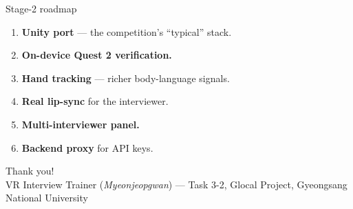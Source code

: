 \documentclass{beamer}
\begin{document}
\begin{frame}{Stage-2 roadmap}
  \begin{enumerate}
    \item \textbf{Unity port} --- the competition's ``typical'' stack.
    \item \textbf{On-device Quest 2 verification.}
    \item \textbf{Hand tracking} --- richer body-language signals.
    \item \textbf{Real lip-sync} for the interviewer.
    \item \textbf{Multi-interviewer panel.}
    \item \textbf{Backend proxy} for API keys.
  \end{enumerate}
  \bigskip
  \begin{center}
    \Large Thank you! \\[4pt]
    \footnotesize VR Interview Trainer (\emph{Myeonjeopgwan}) --- Task 3-2, Glocal Project, Gyeongsang National University
  \end{center}
\end{frame}
\end{document}
